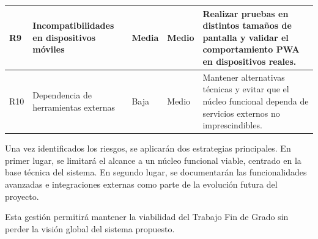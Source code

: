 \begin{table}[htbp]
\begin{tabularx}{\textwidth}{|L{0.9cm}|L{3.4cm}|L{2.5cm}|L{1.6cm}|Y|}
        \hline
        R9 & Incompatibilidades en dispositivos móviles & Media & Medio & Realizar pruebas en distintos tamaños de pantalla y validar el comportamiento PWA en dispositivos reales. \\
        \hline
        R10 & Dependencia de herramientas externas & Baja & Medio & Mantener alternativas técnicas y evitar que el núcleo funcional dependa de servicios externos no imprescindibles. \\
        \hline
    \end{tabularx}
\end{table}

Una vez identificados los riesgos, se aplicarán dos estrategias principales. En primer lugar, se limitará el alcance a un núcleo funcional viable, centrado en la base técnica del sistema. En segundo lugar, se documentarán las funcionalidades avanzadas e integraciones externas como parte de la evolución futura del proyecto.

Esta gestión permitirá mantener la viabilidad del Trabajo Fin de Grado sin perder la visión global del sistema propuesto.
